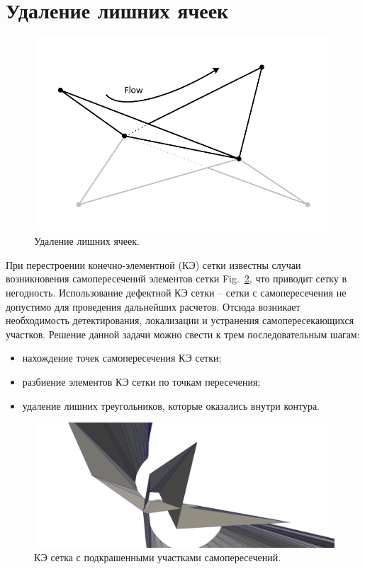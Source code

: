 \documentclass[
11pt,%
tightenlines,%
twoside,%
onecolumn,%
nofloats,%
nobibnotes,%
nofootinbib,%
superscriptaddress,%
noshowpacs,%
centertags]%
{revtex4}
\begin{document}
\section{Удаление лишних ячеек}

\begin{figure}[h]
\includegraphics[width=1.0\textwidth]{pics/pic_del_extra_s.pdf}
\caption{Удаление лишних ячеек.}\label{fig:pic_del_extra_s}
\end{figure}

При перестроении конечно-элементной (КЭ) сетки известны случаи возникновения самопересечений элементов сетки Fig.~\ref{fig:1}, что приводит сетку в негодность. Использование дефектной КЭ сетки – сетки с самопересечения не допустимо для проведения дальнейших расчетов. Отсюда возникает необходимость детектирования, локализации и устранения самопересекающихся участков.
Решение данной задачи можно свести к трем последовательным шагам:

\begin{itemize}
  \item нахождение точек самопересечения КЭ сетки;
  \item разбиение элементов КЭ сетки по точкам пересечения;
  \item удаление лишних треугольников, которые оказались внутри контура.
\end{itemize}

\begin{figure}[h]
\includegraphics[width=1.0\textwidth]{pics/pic_1.png}
\caption{КЭ сетка с подкрашенными участками самопересечений.}\label{fig:1}
\end{figure}
\end{document}
